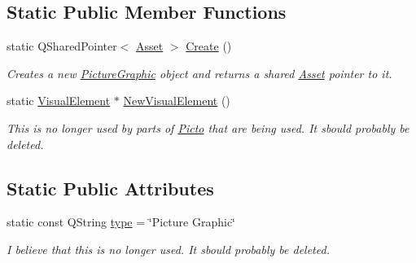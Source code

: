 \subsection*{Static Public Member Functions}
\begin{DoxyCompactItemize}
\item 
\hypertarget{class_picto_1_1_picture_graphic_a11a0a10b6d21fe8945b15d200fe33877}{static Q\-Shared\-Pointer$<$ \hyperlink{class_picto_1_1_asset}{Asset} $>$ \hyperlink{class_picto_1_1_picture_graphic_a11a0a10b6d21fe8945b15d200fe33877}{Create} ()}\label{class_picto_1_1_picture_graphic_a11a0a10b6d21fe8945b15d200fe33877}

\begin{DoxyCompactList}\small\item\em Creates a new \hyperlink{class_picto_1_1_picture_graphic}{Picture\-Graphic} object and returns a shared \hyperlink{class_picto_1_1_asset}{Asset} pointer to it. \end{DoxyCompactList}\item 
\hypertarget{class_picto_1_1_picture_graphic_a603f1f17a3012837e7f40e08ac63f7e5}{static \hyperlink{struct_picto_1_1_visual_element}{Visual\-Element} $\ast$ \hyperlink{class_picto_1_1_picture_graphic_a603f1f17a3012837e7f40e08ac63f7e5}{New\-Visual\-Element} ()}\label{class_picto_1_1_picture_graphic_a603f1f17a3012837e7f40e08ac63f7e5}

\begin{DoxyCompactList}\small\item\em This is no longer used by parts of \hyperlink{namespace_picto}{Picto} that are being used. It sbould probably be deleted. \end{DoxyCompactList}\end{DoxyCompactItemize}
\subsection*{Static Public Attributes}
\begin{DoxyCompactItemize}
\item 
\hypertarget{class_picto_1_1_picture_graphic_a68c467b22e7b787ff12181c872819517}{static const Q\-String \hyperlink{class_picto_1_1_picture_graphic_a68c467b22e7b787ff12181c872819517}{type} = \char`\"{}Picture Graphic\char`\"{}}\label{class_picto_1_1_picture_graphic_a68c467b22e7b787ff12181c872819517}

\begin{DoxyCompactList}\small\item\em I believe that this is no longer used. It sbould probably be deleted. \end{DoxyCompactList}\end{DoxyCompactItemize}
